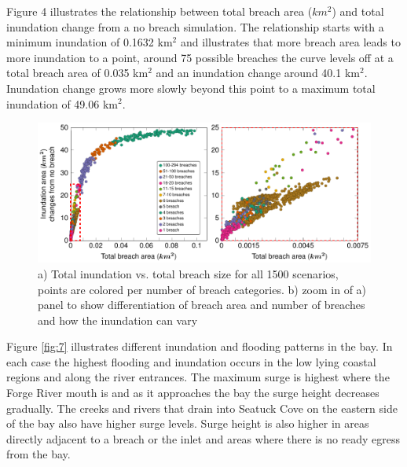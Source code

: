 \documentclass{coastal_paper}
\begin{document}
Figure 4 illustrates the relationship between total breach area ($km^2$) and total inundation change from a no breach simulation. The relationship starts with a minimum inundation of 0.1632 km$^2$ and illustrates that more breach area leads to more inundation to a point, around 75 possible breaches the curve levels off at a total breach area of 0.035 km$^2$ and an inundation change around 40.1 km$^2$. Inundation change grows more slowly beyond this point to a maximum total inundation of 49.06 km$^2$.

\begin{figure}[ht]
    \centering
    \includegraphics[width=\textwidth]{figures/fig5_v2.pdf}
    \caption{a) Total inundation vs. total breach size for all 1500 scenarios, points are colored per number of breach categories. b) zoom in of a) panel to show differentiation of breach area and number of breaches and how the inundation can vary}
    \label{fig:5}
\end{figure}

Figure \ref{fig:7} illustrates different inundation and flooding patterns in the bay. In each case the highest flooding and inundation occurs in the low lying coastal regions and along the river entrances. The maximum surge is highest where the Forge River mouth is and as it approaches the bay the surge height decreases gradually. The creeks and rivers that drain into Seatuck Cove on the eastern side of the bay also have higher surge levels. Surge height is also higher in areas directly adjacent to a breach or the inlet and areas where there is no ready egress from the bay.
\end{document}
